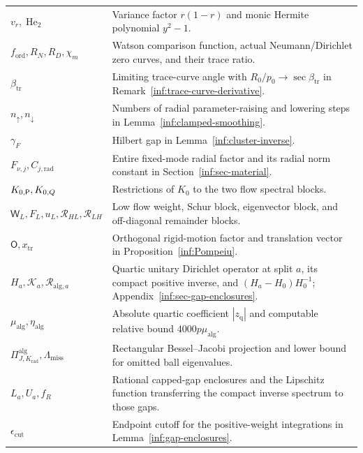 \begin{longtable}{@{}>{\raggedright\arraybackslash}p{}>{\raggedright\arraybackslash}p{}@{}}
$v_r,\operatorname{He}_2$ & Variance factor $r(1-r)$ and monic Hermite polynomial $y^2-1$.\\
$f_{\mathrm{ord}},R_N,R_D,\chi_m$ & Watson comparison function, actual Neumann/Dirichlet zero curves, and their trace ratio.\\
$\beta_{\mathrm{tr}}$ & Limiting trace-curve angle with $R_0/p_0\to\sec\beta_{\mathrm{tr}}$ in Remark~\ref{inf:trace-curve-derivative}.\\
$n_{\uparrow},n_{\downarrow}$ & Numbers of radial parameter-raising and lowering steps in Lemma~\ref{inf:clamped-smoothing}.\\
$\gamma_F$ & Hilbert gap in Lemma~\ref{inf:cluster-inverse}.\\
$F_{\nu,j},C_{j,\mathrm{rad}}$ & Entire fixed-mode radial factor and its radial norm constant in Section~\ref{inf:sec-material}.\\
$K_{0,\mathsf P},K_{0,Q}$ & Restrictions of $K_0$ to the two flow spectral blocks.\\
$\mathsf W_L,F_L,u_L,\mathcal R_{HL},\mathcal R_{LH}$ & Low flow weight, Schur block, eigenvector block, and off-diagonal remainder blocks.\\
$\mathsf O,x_{\mathrm{tr}}$ & Orthogonal rigid-motion factor and translation vector in Proposition~\ref{inf:Pompeiu}.\\
$H_a,\mathcal K_a,\mathcal R_{\mathrm{alg},a}$ & Quartic unitary Dirichlet operator at split $a$, its compact positive inverse, and $(H_a-H_0)H_0^{-1}$; Appendix~\ref{inf:sec-gap-enclosures}.\\
$\mu_{\mathrm{alg}},\eta_{\mathrm{alg}}$ & Absolute quartic coefficient $|z_{\mathrm q}|$ and computable relative bound $4000p\mu_{\mathrm{alg}}$.\\
$\Pi^{\mathrm{alg}}_{J,K_{\mathrm{rad}}},\Lambda_{\mathrm{miss}}$ & Rectangular Bessel--Jacobi projection and lower bound for omitted ball eigenvalues.\\
$L_a,U_a,f_R$ & Rational capped-gap enclosures and the Lipschitz function transferring the compact inverse spectrum to those gaps.\\
$\epsilon_{\mathrm{cut}}$ & Endpoint cutoff for the positive-weight integrations in Lemma~\ref{inf:gap-enclosures}.\\
\bottomrule
\end{longtable}
\endgroup

